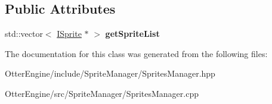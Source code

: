 \subsection*{Public Attributes}
\begin{DoxyCompactItemize}
\item 
std\+::vector$<$ \hyperlink{class_otter_engine_1_1_i_sprite}{I\+Sprite} $\ast$ $>$ {\bfseries get\+Sprite\+List}\hypertarget{class_otter_engine_1_1_sprites_manager_aaf5a502d984e0d234b476b241b281391}{}\label{class_otter_engine_1_1_sprites_manager_aaf5a502d984e0d234b476b241b281391}

\end{DoxyCompactItemize}


The documentation for this class was generated from the following files\+:\begin{DoxyCompactItemize}
\item 
Otter\+Engine/include/\+Sprite\+Manager/Sprites\+Manager.\+hpp\item 
Otter\+Engine/src/\+Sprite\+Manager/Sprites\+Manager.\+cpp\end{DoxyCompactItemize}
